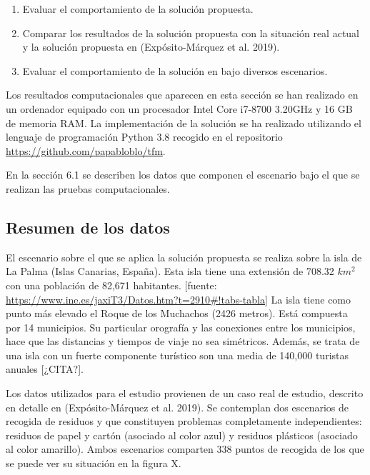 \documentclass[
]{article}
\providecommand{\tightlist}{%
  \setlength{\itemsep}{0pt}\setlength{\parskip}{0pt}}
\begin{document}
\begin{enumerate}
\def\labelenumi{\arabic{enumi}.}
\tightlist
\item
  Evaluar el comportamiento de la solución propuesta.
\item
  Comparar los resultados de la solución propuesta con la situación real
  actual y la solución propuesta en (Expósito-Márquez et al. 2019).
\item
  Evaluar el comportamiento de la solución en bajo diversos escenarios.
\end{enumerate}

Los resultados computacionales que aparecen en esta sección se han
realizado en un ordenador equipado con un procesador Intel Core i7-8700
3.20GHz y 16 GB de memoria RAM. La implementación de la solución se ha
realizado utilizando el lenguaje de programación Python 3.8 recogido en
el repositorio \url{https://github.com/papabloblo/tfm}.

En la sección 6.1 se describen los datos que componen el escenario bajo
el que se realizan las pruebas computacionales.

\hypertarget{resumen-de-los-datos}{%
\subsection{Resumen de los datos}\label{resumen-de-los-datos}}

El escenario sobre el que se aplica la solución propuesta se realiza
sobre la isla de La Palma (Islas Canarias, España). Esta isla tiene una
extensión de 708.32 \(km^2\) con una población de 82,671 habitantes.
{[}fuente:
\url{https://www.ine.es/jaxiT3/Datos.htm?t=2910\#!tabs-tabla}{]} La isla
tiene como punto más elevado el Roque de los Muchachos (2426 metros).
Está compuesta por 14 municipios. Su particular orografía y las
conexiones entre los municipios, hace que las distancias y tiempos de
viaje no sea simétricos. Además, se trata de una isla con un fuerte
componente turístico son una media de 140,000 turistas anuales
{[}¿CITA?{]}.

Los datos utilizados para el estudio provienen de un caso real de
estudio, descrito en detalle en (Expósito-Márquez et al. 2019). Se
contemplan dos escenarios de recogida de residuos y que constituyen
problemas completamente independientes: residuos de papel y cartón
(asociado al color azul) y residuos plásticos (asociado al color
amarillo). Ambos escenarios comparten 338 puntos de recogida de los que
se puede ver su situación en la figura X.
\end{document}
